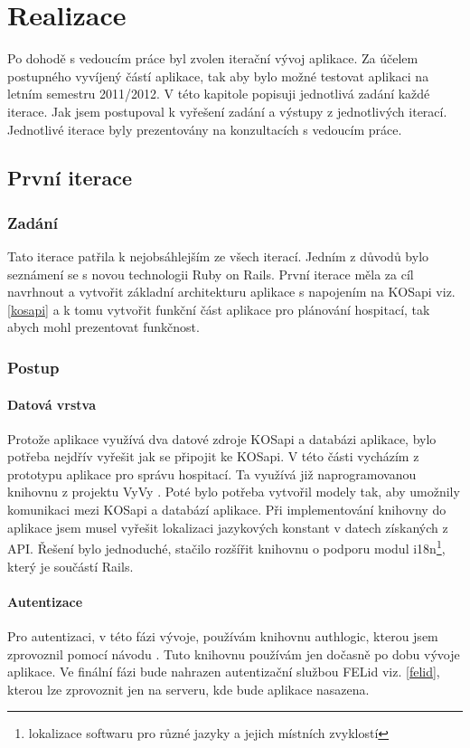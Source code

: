 \chapter{Realizace}
Po dohodě s vedoucím práce byl zvolen iterační vývoj aplikace. Za účelem postupného vyvíjený částí aplikace, tak aby bylo možné testovat aplikaci na letním semestru 2011/2012. V této kapitole popisuji jednotlivá zadání každé iterace. Jak jsem postupoval k vyřešení zadání a výstupy z jednotlivých iterací. Jednotlivé iterace byly prezentovány na konzultacích s vedoucím práce.

\section{První iterace}
\subsection{Zadání}
Tato iterace patřila k nejobsáhlejším ze všech iterací. Jedním z důvodů bylo  seznámení se s novou technologii Ruby on Rails. První iterace měla za cíl navrhnout a vytvořit základní architekturu aplikace s napojením na KOSapi viz. \ref{kosapi} a k tomu vytvořit funkční část aplikace pro plánování hospitací, tak abych mohl prezentovat funkčnost.

\subsection{Postup}
\subsubsection{Datová vrstva}
Protože aplikace využívá dva datové zdroje KOSapi  a databázi aplikace, bylo potřeba nejdřív vyřešit jak se připojit ke KOSapi. V této části vycházím z prototypu aplikace pro správu hospitací. Ta využívá již naprogramovanou knihovnu z projektu VyVy \cite{vyvy}. Poté bylo potřeba vytvořil modely tak, aby umožnily komunikaci mezi KOSapi a databází aplikace. Při implementování knihovny do aplikace jsem musel vyřešit lokalizaci jazykových konstant v datech získaných z API. Řešení bylo jednoduché, stačilo rozšířit knihovnu o podporu modul i18n\footnote{lokalizace softwaru pro různé jazyky a jejich místních zvyklostí}, který je součástí Rails.

\subsubsection{Autentizace}
Pro autentizaci, v této fázi vývoje, používám knihovnu authlogic, kterou jsem zprovoznil pomocí návodu \cite{authlogic}. Tuto knihovnu používám jen dočasně po dobu vývoje aplikace. Ve finální fázi bude nahrazen autentizační službou FELid viz. \ref{felid}, kterou lze zprovoznit jen na serveru, kde bude aplikace nasazena. 

